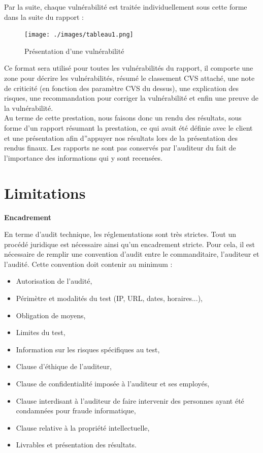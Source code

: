 \documentclass[a4paper]{memoir}
\begin{document}
Par la suite, chaque vulnérabilité est traitée individuellement sous cette forme dans la suite du rapport : 

\begin{figure}[!ht]
    \center
    \texttt{[image: ./images/tableau1.png]}
    \caption{Présentation d'une vulnérabilité}
    \label{ID}
\end{figure}

Ce format sera utilisé pour toutes les vulnérabilités du rapport, il comporte une zone pour décrire les vulnérabilités, résumé le classement CVS attaché, une note de criticité (en fonction des paramètre CVS du dessus), une explication des risques, une recommandation pour corriger la vulnérabilité et enfin une preuve de la vulnérabilité.\\

Au terme de cette prestation, nous faisons donc un rendu des résultats, sous forme d'un rapport résumant la prestation, ce qui avait été définie avec le client et une présentation afin d''appuyer nos résultats lors de la présentation des rendus finaux.
Les rapports ne sont pas conservés par l'auditeur du fait de l'importance des informations qui y sont recensées.

\chapter{Limitations}

\textbf{Encadrement}

En terme d'audit technique, les réglementations sont très strictes. Tout un procédé juridique est nécessaire ainsi qu'un encadrement stricte. Pour cela, il est nécessaire de remplir une convention d'audit entre le commanditaire, l'auditeur et l'audité. Cette convention doit contenir au minimum : 

	\begin{itemize}
		\item Autorisation de l'audité,
		\item Périmètre et modalités du test (IP, URL, dates, horaires...),
		\item Obligation de moyens,
		\item Limites du test,
		\item Information sur les risques spécifiques au test,
		\item Clause d'éthique de l'auditeur,
		\item Clause de confidentialité imposée à l'auditeur et ses employés,
		\item Clause interdisant à l'auditeur de faire intervenir des personnes ayant été condamnées pour fraude informatique,
		\item Clause relative à la propriété intellectuelle,
		\item Livrables et présentation des résultats.
\end{itemize}
\end{document}
